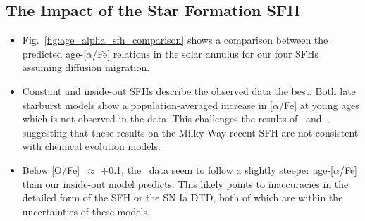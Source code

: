 \documentclass[a4paper, fleqn, usenatbib, useAMS]{mnras}
\begin{document}
\subsection{The Impact of the Star Formation SFH} 
\label{sec:age_alpha:sfh} 
\begin{itemize} 
	\item Fig.~\ref{fig:age_alpha_sfh_comparison} shows a comparison between 
	the predicted age-[$\alpha$/Fe] relations in the solar annulus for our 
	four SFHs assuming diffusion migration. 

	\item Constant and inside-out SFHs describe the observed data the best. 
	Both late starburst models show a population-averaged increase in 
	[$\alpha$/Fe] at young ages which is not observed in the data. This 
	challenges the results of~\citet{Isern2019} and~\citet{Mor2019}, 
	suggesting that these results on the Milky Way recent SFH are not 
	consistent with chemical evolution models. 

	\item Below [O/Fe]~$\approx$ +0.1, the~\citet{Feuillet2019} data seem to 
	follow a slightly steeper age-[$\alpha$/Fe] than our inside-out model 
	predicts. This likely points to inaccuracies in the detailed form of the 
	SFH or the SN Ia DTD, both of which are within the uncertainties of these 
	models. 
\end{itemize} 
\end{document}
